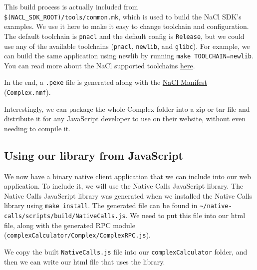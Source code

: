 This build process is actually included from
\texttt{\$(NACL\_SDK\_ROOT)/tools/common.mk}, which is used to build the
NaCl SDK's examples. We use it here to make it easy to change toolchain
and configuration. The default toolchain is \texttt{pnacl} and the
default config is \texttt{Release}, but we could use any of the
available toolchains (\texttt{pnacl}, \texttt{newlib}, and
\texttt{glibc}). For example, we can build the same application using
newlib by running \texttt{make TOOLCHAIN=newlib}. You can read more
about the NaCl supported toolchains
\href{https://developer.chrome.com/native-client/devguide/devcycle/building}{here}.

In the end, a \texttt{.pexe} file is generated along with the
\href{https://developer.chrome.com/native-client/reference/nacl-manifest-format}{NaCl
Manifest} (\texttt{Complex.nmf}).

Interestingly, we can package the whole Complex folder into a zip or tar
file and distribute it for any JavaScript developer to use on their
website, without even needing to compile it.

\subsection{Using our library from
JavaScript}\label{using-our-library-from-javascript}

We now have a binary native client application that we can include into
our web application. To include it, we will use the Native Calls
JavaScript library. The Native Calls JavaScript library was generated
when we installed the Native Calls library using \texttt{make install}.
The generated file can be found in
\texttt{\textasciitilde{}/native-calls/scripts/build/NativeCalls.js}. We
need to put this file into our html file, along with the generated RPC
module (\texttt{complexCalculator/Complex/ComplexRPC.js}).

We copy the built \texttt{NativeCalls.js} file into our
\texttt{complexCalculator} folder, and then we can write our html file
that uses the library.

\begin{Shaded}
\begin{Highlighting}[]
 
 
\end{Highlighting}
\end{Shaded}

